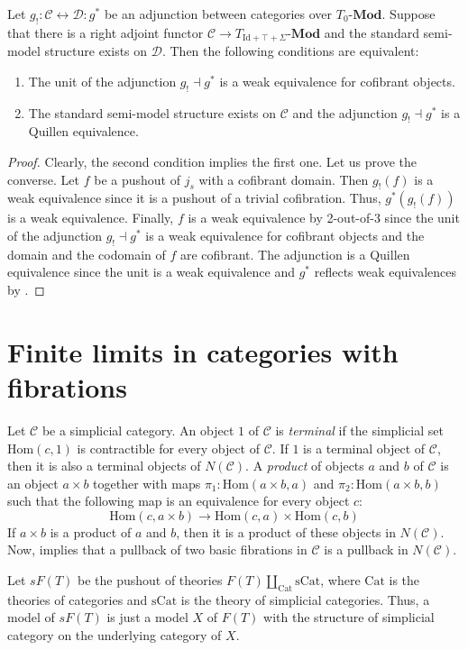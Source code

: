 \documentclass[reqno]{amsart}
\theoremstyle{definition}
\theoremstyle{remark}
\newcommand{\fs}[1]{\mathrm{#1}}
\newcommand{\Hom}{\fs{Hom}}
\newcommand{\cat}[1]{\mathcal{#1}}
\newcommand{\C}{\cat{C}}
\newcommand{\bcat}[1]{\mathbf{#1}}
\newcommand{\Mod}[1]{#1\text{-}\bcat{Mod}}
\numberwithin{figure}{section}
\begin{document}
\begin{prop}
Let $g_! : \mathcal{C} \leftrightarrow \mathcal{D} : g^*$ be an adjunction between categories over $\Mod{T_0}$.
Suppose that there is a right adjoint functor $\mathcal{C} \to \Mod{T_{\fs{Id} + \top + \Sigma}}$ and the standard semi-model structure exists on $\mathcal{D}$.
Then the following conditions are equivalent:
\begin{enumerate}
\item The unit of the adjunction $g_! \dashv g^*$ is a weak equivalence for cofibrant objects.
\item The standard semi-model structure exists on $\mathcal{C}$ and the adjunction $g_! \dashv g^*$ is a Quillen equivalence.
\end{enumerate}
\end{prop}
\begin{proof}
Clearly, the second condition implies the first one.
Let us prove the converse.
Let $f$ be a pushout of $j_s$ with a cofibrant domain.
Then $g_!(f)$ is a weak equivalence since it is a pushout of a trivial cofibration.
Thus, $g^*(g_!(f))$ is a weak equivalence.
Finally, $f$ is a weak equivalence by 2-out-of-3 since the unit of the adjunction $g_! \dashv g^*$ is a weak equivalence for cofibrant objects and the domain and the codomain of $f$ are cofibrant.
The adjunction is a Quillen equivalence since the unit is a weak equivalence and $g^*$ reflects weak equivalences by .
\end{proof}


\section{Finite limits in categories with fibrations}

Let $\C$ be a simplicial category.
An object $1$ of $\C$ is \emph{terminal} if the simplicial set $\Hom(c,1)$ is contractible for every object of $\C$.
If $1$ is a terminal object of $\C$, then it is also a terminal objects of $N(\C)$.
A \emph{product} of objects $a$ and $b$ of $\C$ is an object $a \times b$ together with maps $\pi_1 : \Hom(a \times b, a)$ and $\pi_2 : \Hom(a \times b, b)$ such that the following map is an equivalence for every object $c$:
\[ \Hom(c, a \times b) \to \Hom(c,a) \times \Hom(c,b) \]
If $a \times b$ is a product of $a$ and $b$, then it is a product of these objects in $N(\C)$.
Now,  implies that a pullback of two basic fibrations in $\C$ is a pullback in $N(\C)$.

Let $sF(T)$ be the pushout of theories $F(T) \amalg_{\fs{Cat}} \fs{\fs{sCat}}$, where $\fs{Cat}$ is the theories of categories and $\fs{sCat}$ is the theory of simplicial categories.
Thus, a model of $sF(T)$ is just a model $X$ of $F(T)$ with the structure of simplicial category on the underlying category of $X$.




\end{document}
